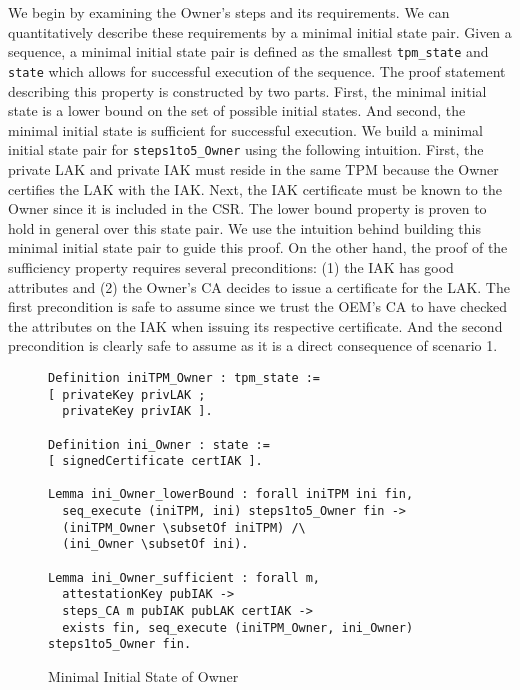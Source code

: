 We begin by examining the Owner's steps and its requirements. We can quantitatively describe these requirements by a minimal initial state pair. Given a sequence, a minimal initial state pair is defined as the smallest \verb|tpm_state| and \verb|state| which allows for successful execution of the sequence. The proof statement describing this property is constructed by two parts. First, the minimal initial state is a lower bound on the set of possible initial states. And second, the minimal initial state is sufficient for successful execution. We build a minimal initial state pair for \verb|steps1to5_Owner| using the following intuition. First, the private LAK and private IAK must reside in the same TPM because the Owner certifies the LAK with the IAK. Next, the IAK certificate must be known to the Owner since it is included in the CSR.  
The lower bound property is proven to hold in general over this state pair. We use the intuition behind building this minimal initial state pair to guide this proof. On the other hand, the proof of the sufficiency property requires several preconditions: (1) the IAK has good attributes and (2) the Owner's CA decides to issue a certificate for the LAK. 
The first precondition is safe to assume since we trust the OEM's CA to have checked the attributes on the IAK when issuing its respective certificate. And the second precondition is clearly safe to assume as it is a direct consequence of scenario 1.
\begin{figure}[h]
\begin{lstlisting}[language=Coq]
Definition iniTPM_Owner : tpm_state :=
[ privateKey privLAK ;
  privateKey privIAK ].

Definition ini_Owner : state :=
[ signedCertificate certIAK ].

Lemma ini_Owner_lowerBound : forall iniTPM ini fin,
  seq_execute (iniTPM, ini) steps1to5_Owner fin ->
  (iniTPM_Owner \subsetOf iniTPM) /\
  (ini_Owner \subsetOf ini).

Lemma ini_Owner_sufficient : forall m,
  attestationKey pubIAK ->
  steps_CA m pubIAK pubLAK certIAK ->
  exists fin, seq_execute (iniTPM_Owner, ini_Owner) steps1to5_Owner fin.
\end{lstlisting}
\caption{Minimal Initial State of Owner}
\end{figure}
